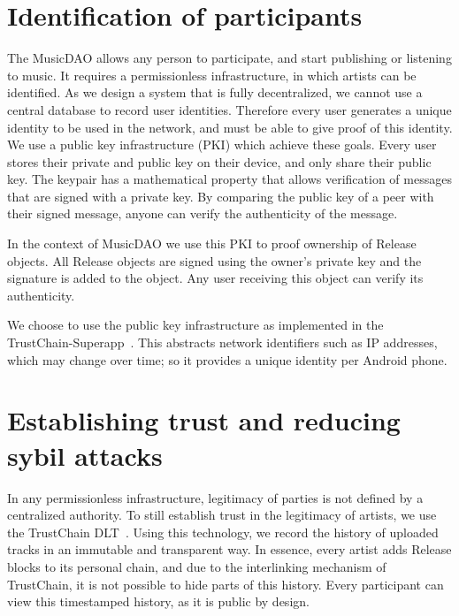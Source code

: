 \section{Identification of participants}
\label{sec:pki-design}
The MusicDAO allows any person to participate, and start publishing or listening to music. It requires a permissionless infrastructure, in which artists can be identified. As we design a system that is fully decentralized, we cannot use a central database to record user identities. Therefore every user generates a unique identity to be used in the network, and must be able to give proof of this identity. We use a public key infrastructure (PKI) which achieve these goals. Every user stores their private and public key on their device, and only share their public key. The keypair has a mathematical property that allows verification of messages that are signed with a private key. By comparing the public key of a peer with their signed message, anyone can verify the authenticity of the message.

In the context of MusicDAO we use this PKI to proof ownership of Release objects. All Release objects are signed using the owner's private key and the signature is added to the object. Any user receiving this object can verify its authenticity. 

We choose to use the public key infrastructure as implemented in the TrustChain-Superapp~\citep{mattskala2020}. This abstracts network identifiers such as IP addresses, which may change over time; so it provides a unique identity per Android phone.

\section{Establishing trust and reducing sybil attacks}
In any permissionless infrastructure, legitimacy of parties is not defined by a centralized authority. To still establish trust in the legitimacy of artists, we use the TrustChain DLT~\citep{otte2017trustchain}. Using this technology, we record the history of uploaded tracks in an immutable and transparent way. In essence, every artist adds Release blocks to its personal chain, and due to the interlinking mechanism of TrustChain, it is not possible to hide parts of this history. Every participant can view this timestamped history, as it is public by design. 


